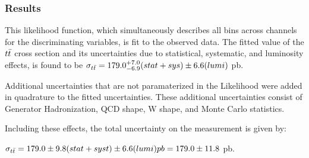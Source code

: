 \subsubsection{Results}

This likelihood function, which simultaneously describes all bins across channels for the discriminating variables, is fit to the observed data.
The fitted value of the $t\bar{t}$ cross section and its uncertainties due to statistical, systematic, and luminosity effects, is found to be $\sigma_{t\bar{t}} = 179.0 ^{+7.0}_{-6.9}(stat+sys) \pm 6.6 (lumi)$ pb.

Additional uncertainties that are not paramaterized in the Likelihood were added in quadrature to the fitted uncertainties.
These additional uncertainties consist of Generator Hadronization, QCD shape, W shape, and Monte Carlo statistics.

Including these effects, the total uncertainty on the measurement is given by:

$\sigma_{t\bar{t}} = 179.0 \pm 9.8 (stat + syst) \pm 6.6 (lumi) pb = 179.0 \pm 11.8$ pb.


